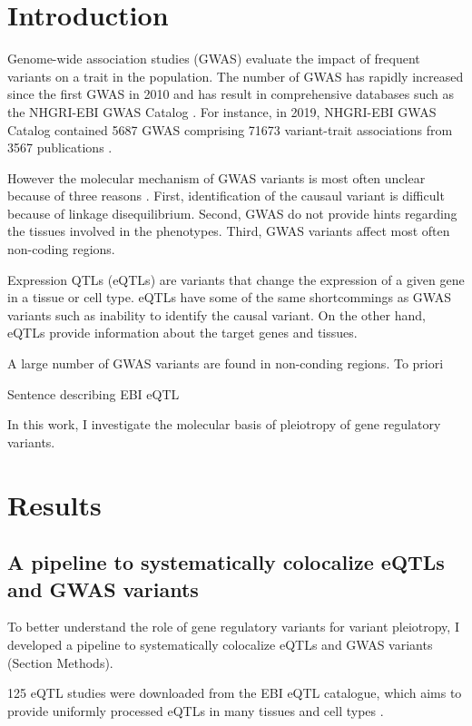\section*{Introduction}\label{sec:introduction}

Genome-wide association studies (GWAS) evaluate the impact of frequent variants on a trait in the population.
%
The number of GWAS has rapidly increased since the first GWAS in 2010 and has result in comprehensive databases such as the NHGRI-EBI GWAS Catalog \citep{2018.Parkinson.Buniello}.
%
For instance, in 2019, NHGRI-EBI GWAS Catalog contained 5687 GWAS comprising 71673 variant-trait associations from 3567 publications \citep{2018.Parkinson.Buniello}.

However the molecular mechanism of GWAS variants is most often unclear because of three reasons \citep{2020.Trynka.CanoGamez}.
%
First, identification of the causaul variant is difficult because of linkage disequilibrium.
%
Second, GWAS do not provide hints regarding the tissues involved in the phenotypes.
%
Third, GWAS variants affect most often non-coding regions.

Expression QTLs (eQTLs) are variants that change the expression of a given gene in a tissue or cell type.
%
eQTLs have some of the same shortcommings as GWAS variants such as inability to identify the causal variant.
%
On the other hand, eQTLs provide information about the target genes and tissues.

A large number of GWAS variants are found in non-conding regions.
To priori

Sentence describing EBI eQTL

In this work, I investigate the molecular basis of pleiotropy of gene regulatory variants.

\section*{Results}\label{s:results}

\subsection*{A pipeline to systematically colocalize eQTLs and GWAS variants}

To better understand the role of gene regulatory variants for variant pleiotropy, I developed a pipeline to systematically colocalize eQTLs and GWAS variants (Section Methods).

125 eQTL studies were downloaded from the EBI eQTL catalogue, which aims to provide uniformly processed eQTLs in many tissues and cell types \citep{2021.Alasoo.Kerimov}.


